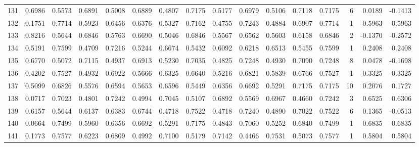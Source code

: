 \begin{tabular}{lrrrrrrrrrrrrrrr}
131 &      0.6986 &  0.5573 &  0.6891 &  0.5008 &  0.6889 &  0.4807 &  0.7175 &  0.5177 &  0.6979 &  0.5106 &   0.7118 &     0.7175 &      6 &                    0.0189 &                    -0.1413 \\
132 &      0.1751 &  0.7714 &  0.5923 &  0.6456 &  0.6376 &  0.5327 &  0.7162 &  0.4755 &  0.7243 &  0.4884 &   0.6907 &     0.7714 &      1 &                    0.5963 &                     0.5963 \\
133 &      0.8216 &  0.5644 &  0.6846 &  0.5763 &  0.6690 &  0.5046 &  0.6846 &  0.5567 &  0.6562 &  0.5603 &   0.6158 &     0.6846 &      2 &                   -0.1370 &                    -0.2572 \\
134 &      0.5191 &  0.7599 &  0.4709 &  0.7216 &  0.5244 &  0.6674 &  0.5432 &  0.6092 &  0.6218 &  0.6513 &   0.5455 &     0.7599 &      1 &                    0.2408 &                     0.2408 \\
135 &      0.6770 &  0.5072 &  0.7115 &  0.4937 &  0.6913 &  0.5230 &  0.7035 &  0.4825 &  0.7248 &  0.4930 &   0.7090 &     0.7248 &      8 &                    0.0478 &                    -0.1698 \\
136 &      0.4202 &  0.7527 &  0.4932 &  0.6922 &  0.5666 &  0.6325 &  0.6640 &  0.5216 &  0.6821 &  0.5839 &   0.6766 &     0.7527 &      1 &                    0.3325 &                     0.3325 \\
137 &      0.5099 &  0.6826 &  0.5576 &  0.6594 &  0.5653 &  0.6596 &  0.5449 &  0.6356 &  0.6692 &  0.5291 &   0.7175 &     0.7175 &     10 &                    0.2076 &                     0.1727 \\
138 &      0.0717 &  0.7023 &  0.4801 &  0.7242 &  0.4994 &  0.7045 &  0.5107 &  0.6892 &  0.5569 &  0.6967 &   0.4660 &     0.7242 &      3 &                    0.6525 &                     0.6306 \\
139 &      0.6157 &  0.5644 &  0.6137 &  0.6383 &  0.6744 &  0.4718 &  0.7522 &  0.4718 &  0.7240 &  0.4890 &   0.7022 &     0.7522 &      6 &                    0.1365 &                    -0.0513 \\
140 &      0.0664 &  0.7499 &  0.5960 &  0.6356 &  0.6692 &  0.5291 &  0.7175 &  0.4843 &  0.7060 &  0.5252 &   0.6840 &     0.7499 &      1 &                    0.6835 &                     0.6835 \\
141 &      0.1773 &  0.7577 &  0.6223 &  0.6809 &  0.4992 &  0.7100 &  0.5179 &  0.7142 &  0.4466 &  0.7531 &   0.5073 &     0.7577 &      1 &                    0.5804 &                     0.5804 \\

\end{tabular}
